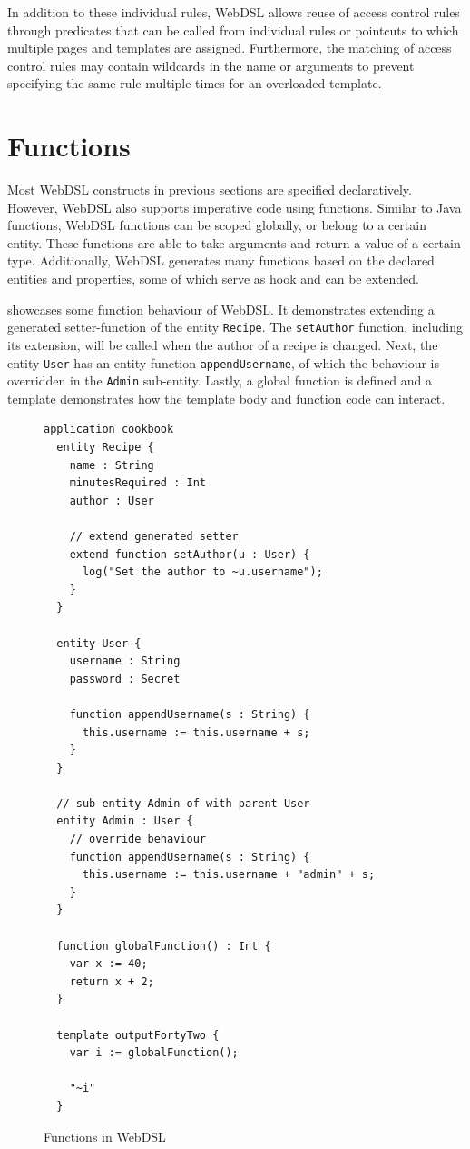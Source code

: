     In addition to these individual rules, WebDSL allows reuse of access control rules through predicates that can be called from individual rules or pointcuts to which multiple pages and templates are assigned. Furthermore, the matching of access control rules may contain wildcards in the name or arguments to prevent specifying the same rule multiple times for an overloaded template.

  \section{\label{sec:functions}Functions}

    Most WebDSL constructs in previous sections are specified declaratively. However, WebDSL also supports imperative code using functions. Similar to Java functions, WebDSL functions can be scoped globally, or belong to a certain entity. These functions are able to take arguments and return a value of a certain type. Additionally, WebDSL generates many functions based on the declared entities and properties, some of which serve as hook and can be extended.

     showcases some function behaviour of WebDSL. It demonstrates extending a generated setter-function of the entity \texttt{Recipe}. The \texttt{setAuthor} function, including its extension, will be called when the author of a recipe is changed. Next, the entity \texttt{User} has an entity function \texttt{appendUsername}, of which the behaviour is overridden in the \texttt{Admin} sub-entity. Lastly, a global function is defined and a template demonstrates how the template body and function code can interact.

    \begin{figure}
      \capstart
      \begin{verbatim}
application cookbook
  entity Recipe {
    name : String
    minutesRequired : Int
    author : User

    // extend generated setter
    extend function setAuthor(u : User) {
      log("Set the author to ~u.username");
    }
  }

  entity User {
    username : String
    password : Secret

    function appendUsername(s : String) {
      this.username := this.username + s;
    }
  }

  // sub-entity Admin of with parent User
  entity Admin : User {
    // override behaviour
    function appendUsername(s : String) {
      this.username := this.username + "admin" + s;
    }
  }

  function globalFunction() : Int {
    var x := 40;
    return x + 2;
  }

  template outputFortyTwo {
    var i := globalFunction();

    "~i"
  }
      \end{verbatim}
      \caption{\label{fig:webdsl-functions}Functions in WebDSL}
    \end{figure}
  
